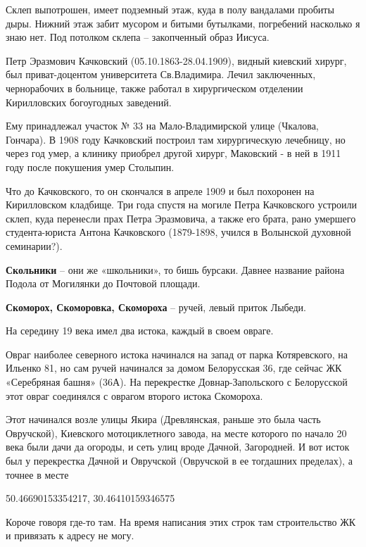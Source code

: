 Склеп выпотрошен, имеет подземный этаж, куда в полу вандалами пробиты дыры. Нижний этаж забит мусором и битыми бутылками, погребений насколько я знаю нет. Под потолком склепа – закопченный образ Иисуса.

Петр Эразмович Качковский (05.10.1863-28.04.1909), видный киевский хирург, был приват-доцентом университета Св.Владимира. Лечил заключенных, чернорабочих в больнице, также работал в хирургическом отделении Кирилловских богоугодных заведений.

Ему принадлежал участок № 33 на Мало-Владимирской улице (Чкалова, Гончара). В 1908 году Качковский построил там  хирургическую лечебницу, но через год умер, а клинику приобрел другой хирург, Маковский - в ней в 1911 году после покушения умер Столыпин.

Что до Качковского, то он скончался в апреле 1909 и был похоронен на Кирилловском кладбище. Три года спустя на могиле Петра Качковского устроили склеп, куда перенесли прах Петра Эразмовича, а также его брата, рано умершего студента-юриста Антона Качковского (1879-1898, учился в Волынской духовной семинарии?).\\

\medskip


\textbf{Скольники} – они же «школьники», то бишь бурсаки. Давнее название района Подола от Могилянки до Почтовой площади.\\

\medskip


\textbf{Скоморох, Скоморовка, Скомороха} – ручей, левый приток Лыбеди. 

На середину 19 века имел два истока, каждый в своем овраге.

Овраг наиболее северного истока начинался на запад от парка Котяревского, на Ильенко 81, но сам ручей начинался за домом Белорусская 36, где сейчас ЖК «Серебряная башня» (36А). На перекрестке Довнар-Запольского с Белорусской этот овраг соединялся с оврагом второго истока Скомороха.

Этот начинался возле улицы Якира (Древлянская, раньше это была часть Овручской), Киевского мотоциклетного завода, на месте которого по начало 20 века были дачи да огороды, и сеть улиц вроде Дачной, Загородней. И вот исток был у перекрестка Дачной и Овручской (Овручской в ее тогдашних пределах), а точнее в месте 

50.46690153354217, 30.46410159346575

Короче говоря где-то там. На время написания этих строк там строительство ЖК и привязать к адресу не могу.

